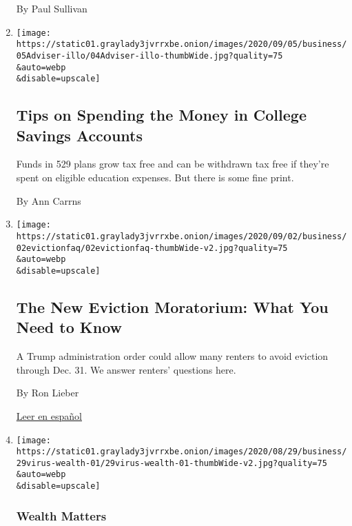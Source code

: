 \begin{enumerate}
  By Paul Sullivan
\item
  \href{/2020/09/04/your-money/college-savings-529.html}{}

  \texttt{[image: https://static01.graylady3jvrrxbe.onion/images/2020/09/05/business/05Adviser-illo/04Adviser-illo-thumbWide.jpg?quality=75\\\&auto=webp\\\&disable=upscale]}

  \hypertarget{tips-on-spending-the-money-in-college-savings-accounts}{%
  \subsection{Tips on Spending the Money in College Savings
  Accounts}\label{tips-on-spending-the-money-in-college-savings-accounts}}

  Funds in 529 plans grow tax free and can be withdrawn tax free if
  they're spent on eligible education expenses. But there is some fine
  print.

  By Ann Carrns
\item
  \href{/2020/09/02/your-money/eviction-moratorium-covid.html}{}

  \texttt{[image: https://static01.graylady3jvrrxbe.onion/images/2020/09/02/business/02evictionfaq/02evictionfaq-thumbWide-v2.jpg?quality=75\\\&auto=webp\\\&disable=upscale]}

  \hypertarget{the-new-eviction-moratorium-what-you-need-to-know}{%
  \subsection{The New Eviction Moratorium: What You Need to
  Know}\label{the-new-eviction-moratorium-what-you-need-to-know}}

  A Trump administration order could allow many renters to avoid
  eviction through Dec. 31. We answer renters' questions here.

  By Ron Lieber

  \href{https://www.nytimes3xbfgragh.onion/es/2020/09/02/espanol/negocios/desalojos-trump.html}{Leer
  en español}
\item
  \href{/2020/08/28/your-money/impact-investing-coronavirus.html}{}

  \texttt{[image: https://static01.graylady3jvrrxbe.onion/images/2020/08/29/business/29virus-wealth-01/29virus-wealth-01-thumbWide-v2.jpg?quality=75\\\&auto=webp\\\&disable=upscale]}

  \hypertarget{wealth-matters-2}{%
  \subsubsection{Wealth Matters}\label{wealth-matters-2}}


\end{enumerate}
